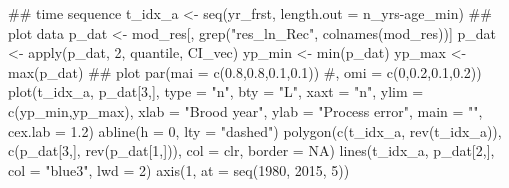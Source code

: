 \documentclass[
  11pt,
]{article}
\newenvironment{Shaded}{}{}
\newcommand{\AttributeTok}[1]{#1}
\newcommand{\CommentTok}[1]{\textcolor[rgb]{0.00,0.50,0.00}{#1}}
\newcommand{\ConstantTok}[1]{#1}
\newcommand{\DecValTok}[1]{#1}
\newcommand{\DocumentationTok}[1]{\textcolor[rgb]{0.00,0.50,0.00}{#1}}
\newcommand{\FloatTok}[1]{#1}
\newcommand{\FunctionTok}[1]{#1}
\newcommand{\NormalTok}[1]{#1}
\newcommand{\OtherTok}[1]{\textcolor[rgb]{1.00,0.25,0.00}{#1}}
\newcommand{\SpecialCharTok}[1]{\textcolor[rgb]{0.00,0.50,0.50}{#1}}
\newcommand{\StringTok}[1]{\textcolor[rgb]{0.00,0.50,0.50}{#1}}
\begin{document}
\begin{Shaded}
\begin{Highlighting}[]
\DocumentationTok{\#\# time sequence}
\NormalTok{t\_idx\_a }\OtherTok{\textless{}{-}} \FunctionTok{seq}\NormalTok{(yr\_frst, }\AttributeTok{length.out =}\NormalTok{ n\_yrs}\SpecialCharTok{{-}}\NormalTok{age\_min)}
\DocumentationTok{\#\# plot data}
\NormalTok{p\_dat }\OtherTok{\textless{}{-}}\NormalTok{ mod\_res[, }\FunctionTok{grep}\NormalTok{(}\StringTok{"res\_ln\_Rec"}\NormalTok{, }\FunctionTok{colnames}\NormalTok{(mod\_res))]}
\NormalTok{p\_dat }\OtherTok{\textless{}{-}} \FunctionTok{apply}\NormalTok{(p\_dat, }\DecValTok{2}\NormalTok{, quantile, CI\_vec)}
\NormalTok{yp\_min }\OtherTok{\textless{}{-}} \FunctionTok{min}\NormalTok{(p\_dat)}
\NormalTok{yp\_max }\OtherTok{\textless{}{-}} \FunctionTok{max}\NormalTok{(p\_dat)}
\DocumentationTok{\#\# plot}
\FunctionTok{par}\NormalTok{(}\AttributeTok{mai =} \FunctionTok{c}\NormalTok{(}\FloatTok{0.8}\NormalTok{,}\FloatTok{0.8}\NormalTok{,}\FloatTok{0.1}\NormalTok{,}\FloatTok{0.1}\NormalTok{)) }\CommentTok{\#, omi = c(0,0.2,0.1,0.2))}
\FunctionTok{plot}\NormalTok{(t\_idx\_a, p\_dat[}\DecValTok{3}\NormalTok{,],}
     \AttributeTok{type =} \StringTok{"n"}\NormalTok{,  }\AttributeTok{bty =} \StringTok{"L"}\NormalTok{, }\AttributeTok{xaxt =} \StringTok{"n"}\NormalTok{, }
     \AttributeTok{ylim =} \FunctionTok{c}\NormalTok{(yp\_min,yp\_max),}
     \AttributeTok{xlab =} \StringTok{"Brood year"}\NormalTok{, }\AttributeTok{ylab =} \StringTok{"Process error"}\NormalTok{, }\AttributeTok{main =} \StringTok{""}\NormalTok{,}
     \AttributeTok{cex.lab =} \FloatTok{1.2}\NormalTok{)}
\FunctionTok{abline}\NormalTok{(}\AttributeTok{h =} \DecValTok{0}\NormalTok{, }\AttributeTok{lty =} \StringTok{"dashed"}\NormalTok{)}
\FunctionTok{polygon}\NormalTok{(}\FunctionTok{c}\NormalTok{(t\_idx\_a, }\FunctionTok{rev}\NormalTok{(t\_idx\_a)), }\FunctionTok{c}\NormalTok{(p\_dat[}\DecValTok{3}\NormalTok{,], }\FunctionTok{rev}\NormalTok{(p\_dat[}\DecValTok{1}\NormalTok{,])),}
        \AttributeTok{col =}\NormalTok{ clr, }\AttributeTok{border =} \ConstantTok{NA}\NormalTok{)}
\FunctionTok{lines}\NormalTok{(t\_idx\_a, p\_dat[}\DecValTok{2}\NormalTok{,], }\AttributeTok{col =} \StringTok{"blue3"}\NormalTok{, }\AttributeTok{lwd =} \DecValTok{2}\NormalTok{)}
\FunctionTok{axis}\NormalTok{(}\DecValTok{1}\NormalTok{, }\AttributeTok{at =} \FunctionTok{seq}\NormalTok{(}\DecValTok{1980}\NormalTok{, }\DecValTok{2015}\NormalTok{, }\DecValTok{5}\NormalTok{))}
\end{Highlighting}
\end{Shaded}
\end{document}
